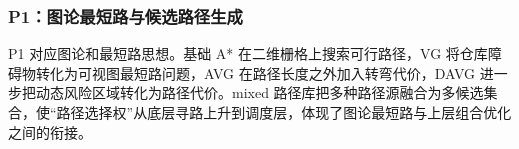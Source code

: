 \subsubsection{P1：图论最短路与候选路径生成}

P1 对应图论和最短路思想。基础 A* 在二维栅格上搜索可行路径，VG 将仓库障碍物转化为可视图最短路问题，AVG 在路径长度之外加入转弯代价，DAVG 进一步把动态风险区域转化为路径代价。mixed 路径库把多种路径源融合为多候选集合，使“路径选择权”从底层寻路上升到调度层，体现了图论最短路与上层组合优化之间的衔接。
